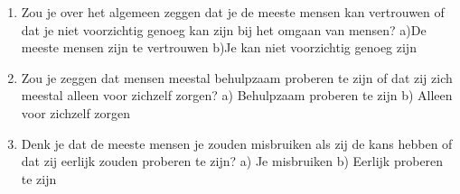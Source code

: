 \begin{enumerate}
\item Zou je over het algemeen zeggen dat je de meeste mensen kan vertrouwen of dat je niet voorzichtig genoeg kan zijn bij het omgaan van mensen?
a)De meeste mensen zijn te vertrouwen 	b)Je kan niet voorzichtig genoeg zijn
\item Zou je zeggen dat mensen meestal behulpzaam proberen te zijn of dat zij zich meestal alleen voor zichzelf zorgen?
a) Behulpzaam proberen te zijn	 b) Alleen voor zichzelf zorgen
\item Denk je dat de meeste mensen je zouden misbruiken als zij de kans hebben of dat zij eerlijk zouden proberen te zijn?
a) Je misbruiken	b) Eerlijk proberen te zijn
\end{enumerate}
